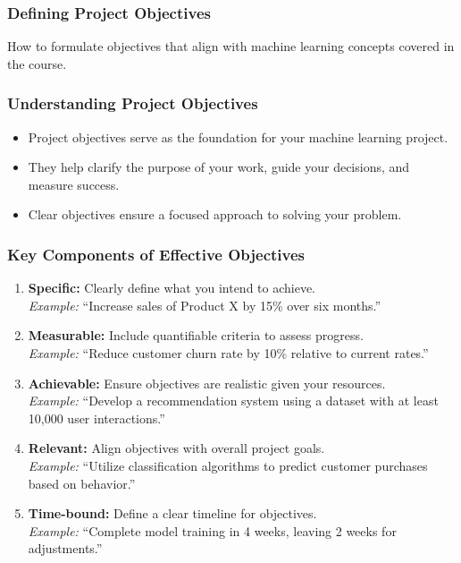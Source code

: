 \documentclass[aspectratio=169]{beamer}
\begin{document}
\begin{frame}[fragile]
    \frametitle{Defining Project Objectives}
    How to formulate objectives that align with machine learning concepts covered in the course.
\end{frame}

\begin{frame}[fragile]
    \frametitle{Understanding Project Objectives}
    \begin{itemize}
        \item Project objectives serve as the foundation for your machine learning project.
        \item They help clarify the purpose of your work, guide your decisions, and measure success.
        \item Clear objectives ensure a focused approach to solving your problem.
    \end{itemize}
\end{frame}

\begin{frame}[fragile]
    \frametitle{Key Components of Effective Objectives}
    \begin{enumerate}
        \item \textbf{Specific:} Clearly define what you intend to achieve. \\
        \textit{Example:} “Increase sales of Product X by 15\% over six months.”
        
        \item \textbf{Measurable:} Include quantifiable criteria to assess progress. \\
        \textit{Example:} “Reduce customer churn rate by 10\% relative to current rates.”
        
        \item \textbf{Achievable:} Ensure objectives are realistic given your resources. \\
        \textit{Example:} “Develop a recommendation system using a dataset with at least 10,000 user interactions.”
        
        \item \textbf{Relevant:} Align objectives with overall project goals. \\
        \textit{Example:} “Utilize classification algorithms to predict customer purchases based on behavior.”
        
        \item \textbf{Time-bound:} Define a clear timeline for objectives. \\
        \textit{Example:} “Complete model training in 4 weeks, leaving 2 weeks for adjustments.”
    \end{enumerate}
\end{frame}
\end{document}
